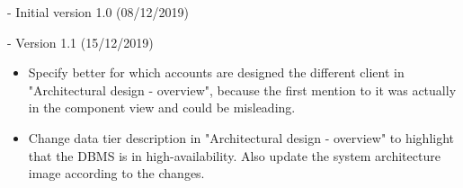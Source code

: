 - Initial version 1.0 (08/12/2019)

- Version 1.1 (15/12/2019)
\begin{itemize}
	\item Specify better for which accounts are designed the different client in "Architectural design - overview", because the first mention to it was actually in the component view and could be misleading.
	\item Change data tier description in "Architectural design - overview" to highlight that the DBMS is in high-availability. Also update the system architecture image according to the changes.
\end{itemize}